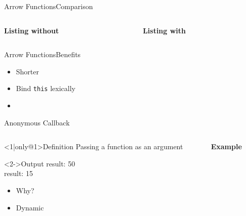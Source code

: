 \documentclass[pdf,table]{beamer}
\begin{document}
\begin{frame}{Arrow Functions}{Comparison}
	\begin{columns}[T]
		\begin{column}{0.48\textwidth}
			{\bf Listing without}
				
		\end{column}
		\begin{column}{0.48\textwidth}
			{\bf Listing with}
			
		\end{column}
	\end{columns}	
\end{frame}


\begin{frame}{Arrow Functions}{Benefits}
	\begin{itemize}
		\item Shorter
		\item Bind {\tt this} lexically
		\item 
	\end{itemize}
\end{frame}
\begin{frame}{Anonymous Callback}
	\begin{columns}[T]
		\begin{column}{0.48\textwidth}
			\begin{block}<1|only@1>{Definition}
				Passing a function as an argument
			\end{block}
			\begin{block}<2->{Output}
				result: 50 \\ result: 15
			\end{block}
			\begin{itemize}
				\item Why?
				\item Dynamic
			\end{itemize}
			
		\end{column}
		\begin{column}{0.48\textwidth}
			{\bf Example}
			
		\end{column}
	\end{columns}	
\end{frame}
\end{document}
